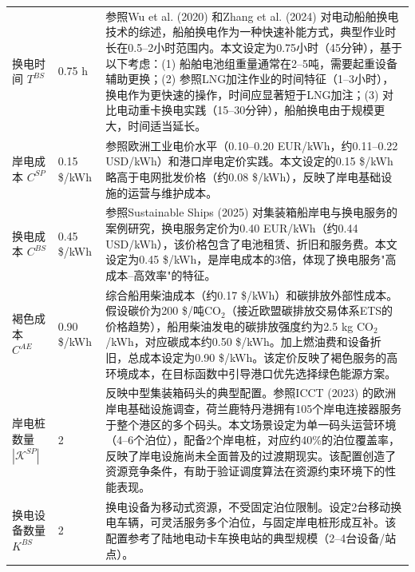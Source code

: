 \documentclass[UTF8, a4paper, 12pt]{ctexart}
\begin{document}
\begin{table}[htbp]
\begin{threeparttable}
\begin{tabular}{p{3.2cm} p{2cm} p{9cm}}
        \addlinespace
        换电时间 $T^{BS}$ & 0.75 h & 参照Wu et al. (2020) \cite{Wu2020_Review}和Zhang et al. (2024) \cite{Zhang2024_Voyage}对电动船舶换电技术的综述，船舶换电作为一种快速补能方式，典型作业时长在0.5--2小时范围内。本文设定为0.75小时（45分钟），基于以下考虑：(1) 船舶电池组重量通常在2--5吨，需要起重设备辅助更换；(2) 参照LNG加注作业的时间特征（1--3小时）\cite{Fan2021}，换电作为更快速的操作，时间应显著短于LNG加注；(3) 对比电动重卡换电实践（15--30分钟），船舶换电由于规模更大，时间适当延长。 \\
        \addlinespace
        岸电成本 $C^{SP}$ & 0.15 \$/kWh & 参照欧洲工业电价水平（0.10--0.20 EUR/kWh，约0.11--0.22 USD/kWh）和港口岸电定价实践。本文设定的0.15 \$/kWh略高于电网批发价格（约0.08 \$/kWh），反映了岸电基础设施的运营与维护成本。 \\
        \addlinespace
        换电成本 $C^{BS}$ & 0.45 \$/kWh & 参照Sustainable Ships (2025) \cite{SustainableShips2025}对集装箱船岸电与换电服务的案例研究，换电服务定价为0.40 EUR/kWh（约0.44 USD/kWh），该价格包含了电池租赁、折旧和服务费。本文设定为0.45 \$/kWh，是岸电成本的3倍，体现了换电服务"高成本--高效率"的特征。 \\
        \addlinespace
        褐色成本 $C^{AE}$ & 0.90 \$/kWh & 综合船用柴油成本（约0.17 \$/kWh）和碳排放外部性成本。假设碳价为200 \$/吨CO$_2$（接近欧盟碳排放交易体系ETS的价格趋势），船用柴油发电的碳排放强度约为2.5 kg CO$_2$/kWh，对应碳成本约0.50 \$/kWh。加上燃油费和设备折旧，总成本设定为0.90 \$/kWh。该定价反映了褐色服务的高环境成本，在目标函数中引导港口优先选择绿色能源方案。 \\
        \addlinespace
        岸电桩数量 $|\mathcal{K}^{SP}|$ & 2 & 反映中型集装箱码头的典型配置。参照ICCT (2023) \cite{ICCT2023}的欧洲岸电基础设施调查，荷兰鹿特丹港拥有105个岸电连接器服务于整个港区的多个码头。本文场景设定为单一码头运营环境（4--6个泊位），配备2个岸电桩，对应约40\%的泊位覆盖率，反映了岸电设施尚未全面普及的过渡期现实。该配置创造了资源竞争条件，有助于验证调度算法在资源约束环境下的性能表现。 \\
        \addlinespace
        换电设备数量 $K^{BS}$ & 2 & 换电设备为移动式资源，不受固定泊位限制。设定2台移动换电车辆，可灵活服务多个泊位，与固定岸电桩形成互补。该配置参考了陆地电动卡车换电站的典型规模（2--4台设备/站点）。 \\
        \bottomrule
    \end{tabular}
    \end{threeparttable}
\end{table}
\end{document}

